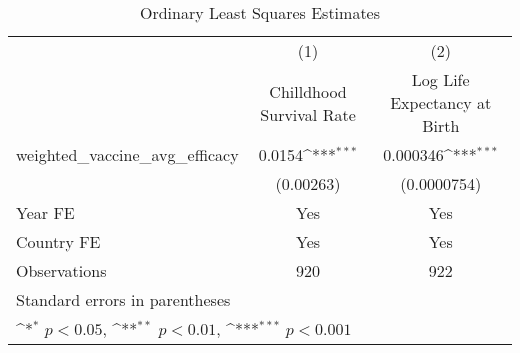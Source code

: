 \begin{table}[htbp]\centering
\def\sym#1{\ifmmode^{#1}\else\(^{#1}\)\fi}
\caption{Ordinary Least Squares Estimates}
\begin{tabular}{l*{2}{c}}
\toprule
                &\multicolumn{1}{c}{(1)}&\multicolumn{1}{c}{(2)}\\
                &\multicolumn{1}{c}{Chilldhood Survival Rate}&\multicolumn{1}{c}{Log Life Expectancy at Birth}\\
\midrule
weighted\_vaccine\_avg\_efficacy&   0.0154\sym{***}& 0.000346\sym{***}\\
                &(0.00263)         &(0.0000754)         \\
\midrule
Year FE         &      Yes         &      Yes         \\
Country FE      &      Yes         &      Yes         \\
Observations    &      920         &      922         \\

\bottomrule
\multicolumn{3}{l}{\footnotesize Standard errors in parentheses}\\
\multicolumn{3}{l}{\footnotesize \sym{*} \(p<0.05\), \sym{**} \(p<0.01\), \sym{***} \(p<0.001\)}\\
\end{tabular}
\end{table}
